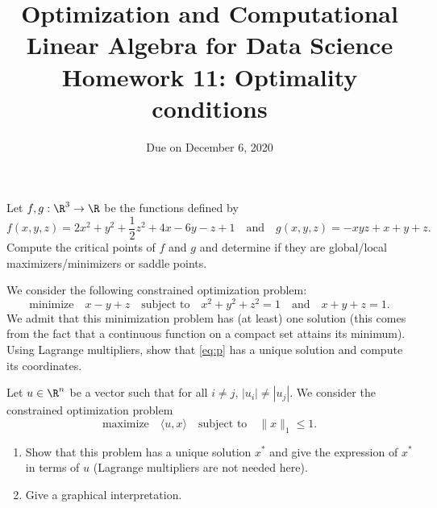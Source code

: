 \documentclass[11pt,nocut]{article}
\title{\vspace{-2.0cm}%
	Optimization and Computational Linear Algebra for Data Science\\
Homework 11: Optimality conditions}
\date{}
\author{Due on December 6, 2020}
\begin{document}
\maketitle


\vspace{1mm}

\begin{problem}[2 points]
	Let $f,g: \R^3 \to \R$ be the functions defined by
	$$
	f(x,y,z) = 2x^2 + y^2 + \frac{1}{2} z^2 + 4x - 6y - z + 1
	\quad \text{and} \quad
	g(x,y,z) =-xyz + x+y+z .
	$$
	Compute the critical points of $f$ and $g$ and determine if they are global/local maximizers/minimizers or saddle points.
\end{problem}

\vspace{5mm}

\begin{problem}[3 points]
	We consider the following constrained optimization problem:
	\begin{equation}\label{eq:p}
	\text{minimize} \quad x-y+z \quad \text{subject to} \quad x^2 + y^2 + z^2=1 \quad \text{and} \quad x+y+z=1.
	\end{equation}
	We admit that this minimization problem has (at least) one solution (this comes from the fact that a continuous function on a compact set attains its minimum).
	\\

		Using Lagrange multipliers, show that \eqref{eq:p} has a unique solution and compute its coordinates.
\end{problem}

\vspace{5mm}

\begin{problem}[2 points]
	Let $u \in \R^n$ be a vector such that for all $i \neq j$, $|u_i| \neq |u_j|$. We consider the constrained optimization problem
	$$
	\text{maximize} \quad \langle u ,x \rangle \quad \text{subject to} \quad \|x\|_1 \leq 1.
	$$
	\begin{enumerate}[label=\normalfont(\textbf{\alph*})]
		\item Show that this problem has a unique solution $x^*$ and give the expression of $x^*$ in terms of $u$ (Lagrange multipliers are not needed here).
		\item Give a graphical interpretation.
	\end{enumerate}
\end{problem}
\end{document}
